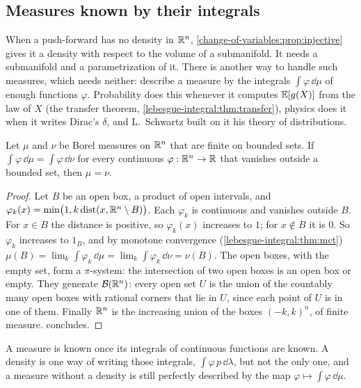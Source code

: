\begin{notechapter}
\section{Measures known by their integrals}
\label{change-of-variables:sec:functionals}

When a push-forward has no density in $\mathbb{R}^n$,
\cref{change-of-variables:prop:injective} gives it a density with
respect to the volume of a submanifold. It needs a submanifold and a
parametrization of it. There is
another way to handle such measures, which needs neither: describe a
measure by the integrals $\int\varphi\,\dd\mu$ of enough functions
$\varphi$. Probability does this whenever it computes $\mathbb{E}[g(X)]$ from the
law of $X$ (the transfer theorem, \cref{lebesgue-integral:thm:transfer}),
physics does it when it writes Dirac's $\delta$, and L.~Schwartz built on
it his theory of distributions.

\begin{proposition}
\label{change-of-variables:prop:testfunctions}
Let $\mu$ and $\nu$ be Borel measures on $\mathbb{R}^n$ that are finite on
bounded sets. If $\int\varphi\,\dd\mu = \int\varphi\,\dd\nu$ for every
continuous $\varphi:\mathbb{R}^n\to\mathbb{R}$ that vanishes outside a bounded set, then
$\mu = \nu$.
\end{proposition}

\begin{proof}
Let $B$ be an open box, a product of open intervals, and
$\varphi_k(x) = \min\bigl(1, k\operatorname{dist}(x, \mathbb{R}^n\setminus
B)\bigr)$. Each $\varphi_k$ is continuous and vanishes outside $B$. For
$x\in B$ the distance is positive, so $\varphi_k(x)$ increases to $1$;
for $x\notin B$ it is $0$. So $\varphi_k$ increases to $1_B$, and by
monotone convergence (\cref{lebesgue-integral:thm:mct})
$\mu(B) = \lim_k\int\varphi_k\,\dd\mu = \lim_k\int\varphi_k\,\dd\nu =
\nu(B)$. The open boxes, with the empty set, form a $\pi$-system: the
intersection of two open boxes is an open box or empty. They generate
$\mathcal B(\mathbb{R}^n)$: every open set $U$ is the union of the countably
many open boxes with rational corners that lie in $U$, since each point
of $U$ is in one of them. Finally $\mathbb{R}^n$ is the increasing union of the
boxes $(-k, k)^n$, of finite measure. 
concludes.
\end{proof}

\begin{intuition}
A measure is known once its integrals of continuous functions are
known. A density is one way of writing those integrals,
$\int\varphi\,p\,\dd\lambda$, but not the only one, and a measure without
a density is still perfectly described by the map
$\varphi\mapsto\int\varphi\,\dd\mu$.
\end{intuition}


\end{notechapter}
